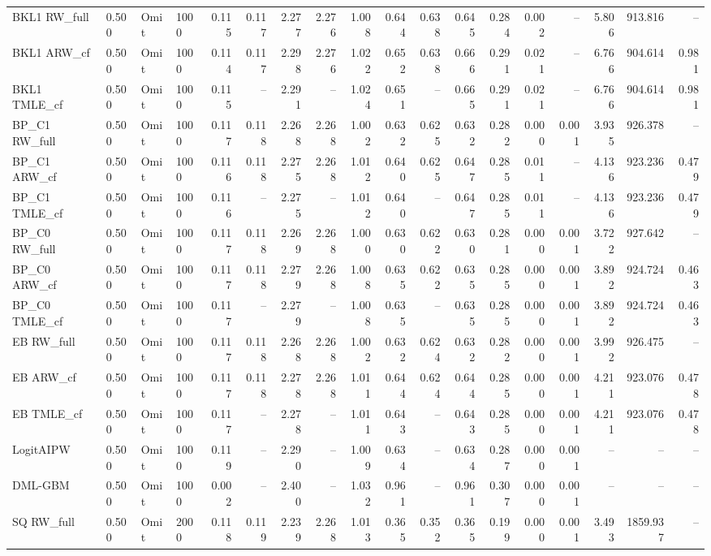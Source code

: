 \begin{tabular}{llllrrrrrrrrrrrrrr}
BKL1 RW\_full & 0.500 & Omit & 1000 & 0.115 & 0.117 & 2.277 & 2.276 & 1.008 & 0.644 & 0.638 & 0.645 & 0.284 & 0.002 & -- & 5.806 & 913.816 & -- \\
BKL1 ARW\_cf & 0.500 & Omit & 1000 & 0.114 & 0.117 & 2.298 & 2.276 & 1.022 & 0.652 & 0.638 & 0.666 & 0.291 & 0.021 & -- & 6.766 & 904.614 & 0.981 \\
BKL1 TMLE\_cf & 0.500 & Omit & 1000 & 0.115 & -- & 2.291 & -- & 1.024 & 0.651 & -- & 0.665 & 0.291 & 0.021 & -- & 6.766 & 904.614 & 0.981 \\
BP\_C1 RW\_full & 0.500 & Omit & 1000 & 0.117 & 0.118 & 2.268 & 2.268 & 1.002 & 0.632 & 0.625 & 0.632 & 0.282 & 0.000 & 0.001 & 3.935 & 926.378 & -- \\
BP\_C1 ARW\_cf & 0.500 & Omit & 1000 & 0.116 & 0.118 & 2.275 & 2.268 & 1.012 & 0.640 & 0.625 & 0.647 & 0.285 & 0.011 & -- & 4.136 & 923.236 & 0.479 \\
BP\_C1 TMLE\_cf & 0.500 & Omit & 1000 & 0.116 & -- & 2.275 & -- & 1.012 & 0.640 & -- & 0.647 & 0.285 & 0.011 & -- & 4.136 & 923.236 & 0.479 \\
BP\_C0 RW\_full & 0.500 & Omit & 1000 & 0.117 & 0.118 & 2.269 & 2.268 & 1.000 & 0.630 & 0.622 & 0.630 & 0.281 & 0.000 & 0.001 & 3.722 & 927.642 & -- \\
BP\_C0 ARW\_cf & 0.500 & Omit & 1000 & 0.117 & 0.118 & 2.279 & 2.268 & 1.008 & 0.635 & 0.622 & 0.635 & 0.285 & 0.000 & 0.001 & 3.892 & 924.724 & 0.463 \\
BP\_C0 TMLE\_cf & 0.500 & Omit & 1000 & 0.117 & -- & 2.279 & -- & 1.008 & 0.635 & -- & 0.635 & 0.285 & 0.000 & 0.001 & 3.892 & 924.724 & 0.463 \\
EB RW\_full & 0.500 & Omit & 1000 & 0.117 & 0.118 & 2.268 & 2.268 & 1.002 & 0.632 & 0.624 & 0.632 & 0.282 & 0.000 & 0.001 & 3.992 & 926.475 & -- \\
EB ARW\_cf & 0.500 & Omit & 1000 & 0.117 & 0.118 & 2.278 & 2.268 & 1.011 & 0.644 & 0.624 & 0.644 & 0.285 & 0.000 & 0.001 & 4.211 & 923.076 & 0.478 \\
EB TMLE\_cf & 0.500 & Omit & 1000 & 0.117 & -- & 2.278 & -- & 1.011 & 0.643 & -- & 0.643 & 0.285 & 0.000 & 0.001 & 4.211 & 923.076 & 0.478 \\
LogitAIPW & 0.500 & Omit & 1000 & 0.119 & -- & 2.290 & -- & 1.009 & 0.634 & -- & 0.634 & 0.287 & 0.000 & 0.001 & -- & -- & -- \\
DML-GBM & 0.500 & Omit & 1000 & 0.002 & -- & 2.400 & -- & 1.032 & 0.961 & -- & 0.961 & 0.307 & 0.000 & 0.001 & -- & -- & -- \\
SQ RW\_full & 0.500 & Omit & 2000 & 0.118 & 0.119 & 2.239 & 2.268 & 1.013 & 0.365 & 0.352 & 0.365 & 0.199 & 0.000 & 0.001 & 3.493 & 1859.937 & -- \\

\end{tabular}

